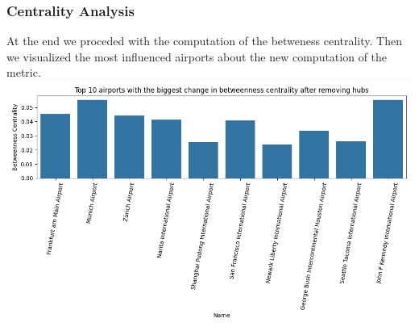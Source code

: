 \documentclass[12pt]{article}
\begin{document}
\begin{minipage}{\textwidth}
    \subsubsection{Centrality Analysis}
    {At the end we proceded with the computation of the betweness centrality. Then we visualized the most influenced airports about the new computation of the metric.}
    \centering
    \includegraphics[width=1\linewidth]{img/biggest_changes_betweenness_centrality.png}
\end{minipage}

 
\end{document}
